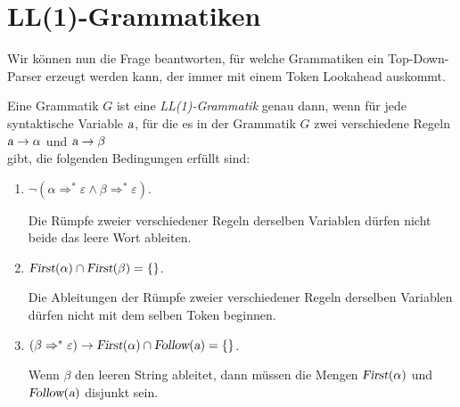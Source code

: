\section{LL(1)-Grammatiken}
Wir können nun die Frage beantworten, für welche Grammatiken ein Top-Down-Parser erzeugt
werden kann, der immer mit einem Token Lookahead auskommt.  

\begin{Definition}[LL(1)-Grammatik]
Eine Grammatik $G$ ist eine \emph{LL(1)-Grammatik} genau dann, wenn für jede syntaktische Variable
$\textsl{a}$, für die es in der Grammatik $G$ zwei verschiedene Regeln
\\[0.2cm]
\hspace*{1.3cm}
$\textsl{a} \rightarrow \alpha$ \quad und \quad $\textsl{a} \rightarrow \beta$ 
\\[0.2cm]
gibt, die folgenden Bedingungen erfüllt sind:
\begin{enumerate}
\item $\neg( \alpha \Rightarrow^* \varepsilon \wedge \beta \Rightarrow^* \varepsilon)$.

      Die Rümpfe zweier verschiedener Regeln derselben Variablen
      dürfen nicht beide das leere Wort ableiten.
\item $\textsl{First}(\alpha) \cap \textsl{First}(\beta) = \{\}$.

      Die Ableitungen der Rümpfe zweier verschiedener Regeln derselben Variablen
      dürfen nicht mit dem selben Token beginnen.
\item   $(\beta  \Rightarrow^* \varepsilon) \rightarrow \textsl{First}(\alpha) \cap
\textsl{Follow}(\textsl{a}) = \{\}$.

      Wenn $\beta$ den leeren String ableitet, dann müssen die Mengen
      $\textsl{First}(\alpha)$ und $\textsl{Follow}(\textsl{a})$ disjunkt sein.  
      \eox
\end{enumerate}
\end{Definition}

